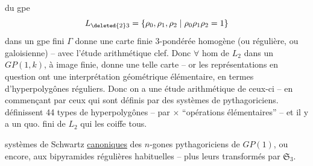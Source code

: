    du gpe 
\[L_{\deleted{2}3}=\{\rho_0,\rho_1,\rho_2\mid\rho_0\rho_1\rho_2=1\}\]
dans un gpe fini $\Gamma$ donne une carte finie
 $3$-pondérée homogène (ou régulière,
ou galoisienne) -- avec l'étude arithmétique
 clef. Donc $\forall$ hom de $L_2$ dans un
$GP(1,k)$,  à image finie, donne une telle
carte -- or les représentations en question
ont une interprétation géométrique
élémentaire, en termes d'hyperpolygônes
réguliers. Donc on a une étude
arithmétique  de ceux-ci -- en
commençant par ceux qui sont
définis par des systèmes de 
 pythagoriciens.  définissent
44 types de hyperpolygônes --  par
 $\times$ ``opérations élémentaires'' --
et il y a un  quo.  fini de
$L_2$ qui les coiffe tous.

systèmes de Schwartz \uline{canoniques}
des $n$-gones pythagoriciens de $GP(1)$,
ou encore, aux bipyramides régulières habituelles
-- plus leurs transformés par $\mathfrak S_3$.


